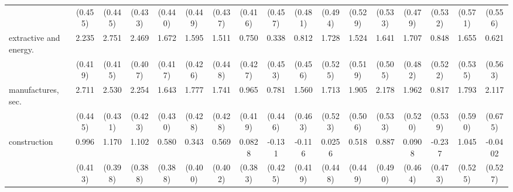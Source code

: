 {\begin{tabular}{l*{16}{c}}
                    &     (0.455)         &     (0.445)         &     (0.433)         &     (0.440)         &     (0.449)         &     (0.437)         &     (0.416)         &     (0.457)         &     (0.481)         &     (0.494)         &     (0.529)         &     (0.533)         &     (0.479)         &     (0.532)         &     (0.571)         &     (0.556)         \\
[1em]
extractive and energy.&       2.235\sym{***}&       2.751\sym{***}&       2.469\sym{***}&       1.672\sym{***}&       1.595\sym{***}&       1.511\sym{***}&       0.750         &       0.338         &       0.812         &       1.728\sym{**} &       1.524\sym{**} &       1.641\sym{**} &       1.707\sym{***}&       0.848         &       1.655\sym{**} &       0.621         \\
                    &     (0.419)         &     (0.415)         &     (0.407)         &     (0.417)         &     (0.426)         &     (0.448)         &     (0.427)         &     (0.453)         &     (0.456)         &     (0.525)         &     (0.519)         &     (0.505)         &     (0.482)         &     (0.522)         &     (0.535)         &     (0.563)         \\
[1em]
manufactures, sec.  &       2.711\sym{***}&       2.530\sym{***}&       2.254\sym{***}&       1.643\sym{***}&       1.777\sym{***}&       1.741\sym{***}&       0.965\sym{*}  &       0.781         &       1.560\sym{***}&       1.713\sym{**} &       1.905\sym{***}&       2.178\sym{***}&       1.962\sym{***}&       0.817         &       1.793\sym{**} &       2.117\sym{**} \\
                    &     (0.445)         &     (0.431)         &     (0.423)         &     (0.430)         &     (0.428)         &     (0.428)         &     (0.419)         &     (0.446)         &     (0.463)         &     (0.523)         &     (0.506)         &     (0.533)         &     (0.520)         &     (0.539)         &     (0.590)         &     (0.675)         \\
[1em]
construction        &       0.996\sym{*}  &       1.170\sym{**} &       1.102\sym{**} &       0.580         &       0.343         &       0.569         &      0.0828         &      -0.131         &      -0.116         &      0.0256         &       0.518         &       0.887         &      0.0908         &      -0.237         &       1.045\sym{*}  &     -0.0402         \\
                    &     (0.413)         &     (0.398)         &     (0.388)         &     (0.388)         &     (0.400)         &     (0.402)         &     (0.383)         &     (0.425)         &     (0.419)         &     (0.448)         &     (0.449)         &     (0.490)         &     (0.464)         &     (0.473)         &     (0.525)         &     (0.527)         \\

\end{tabular}}
